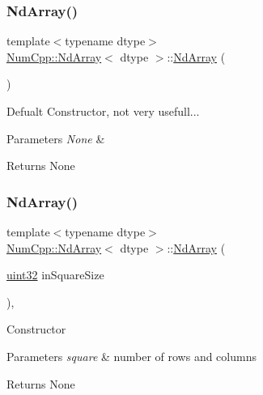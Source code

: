 \subsubsection{\texorpdfstring{Nd\+Array()}{NdArray()}\hspace{0.1cm}{\footnotesize\ttfamily [1/12]}}
{\footnotesize\ttfamily template$<$typename dtype$>$ \\
\mbox{\hyperlink{class_num_cpp_1_1_nd_array}{Num\+Cpp\+::\+Nd\+Array}}$<$ dtype $>$\+::\mbox{\hyperlink{class_num_cpp_1_1_nd_array}{Nd\+Array}} (\begin{DoxyParamCaption}{ }\end{DoxyParamCaption})\hspace{0.3cm}{\ttfamily [inline]}}

Defualt Constructor, not very usefull...


\begin{DoxyParams}{Parameters}
{\em None} & \\
\hline
\end{DoxyParams}
\begin{DoxyReturn}{Returns}
None 
\end{DoxyReturn}
\mbox{\label{class_num_cpp_1_1_nd_array_aa1b7e379179f2dd68342dbde5e2540e4}} 
\subsubsection{\texorpdfstring{Nd\+Array()}{NdArray()}\hspace{0.1cm}{\footnotesize\ttfamily [2/12]}}
{\footnotesize\ttfamily template$<$typename dtype$>$ \\
\mbox{\hyperlink{class_num_cpp_1_1_nd_array}{Num\+Cpp\+::\+Nd\+Array}}$<$ dtype $>$\+::\mbox{\hyperlink{class_num_cpp_1_1_nd_array}{Nd\+Array}} (\begin{DoxyParamCaption}\item[{\mbox{\hyperlink{namespace_num_cpp_a36f388e948380413c63011cab9b7fbd5}{uint32}}}]{in\+Square\+Size }\end{DoxyParamCaption})\hspace{0.3cm}{\ttfamily [inline]}, {\ttfamily [explicit]}}

Constructor


\begin{DoxyParams}{Parameters}
{\em square} & number of rows and columns \\
\hline
\end{DoxyParams}
\begin{DoxyReturn}{Returns}
None 
\end{DoxyReturn}
\mbox{\label{class_num_cpp_1_1_nd_array_a7f12eb75e8436564c1f273f6236395db}} 
